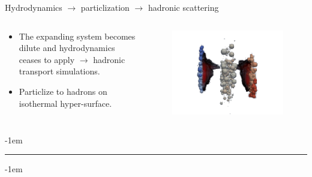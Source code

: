 \documentclass[11pt]{beamer}
\begin{document}
\begin{frame}{Hydrodynamics $\rightarrow$ particlization $\rightarrow$ hadronic scattering}
\begin{columns}[onlytextwidth]
\begin{column}{0.85\textwidth}
\begin{itemize}
  	\item The expanding system becomes dilute and hydrodynamics ceases to apply $\rightarrow$ hadronic transport simulations. 
  	\item Particlize to hadrons on isothermal hyper-surface.
  \end{itemize}
  \end{column}
  \begin{column}{0.2\textwidth}
    \begin{figure}
   	\begin{center}
   	\includegraphics[width=\textwidth]{pics/new230.png}
	\end{center} 	
  	\end{figure}
  \end{column}
\end{columns}
\kern-1em
\begin{center}
\rule{11cm}{0.5pt}
\end{center}
\kern-1em
\begin{columns}
 \begin{column}{0.15\textwidth}
    \begin{figure}
   	\begin{center}

\end{center}
\end{figure}
\end{column}
\end{columns}
\end{frame}
\end{document}
